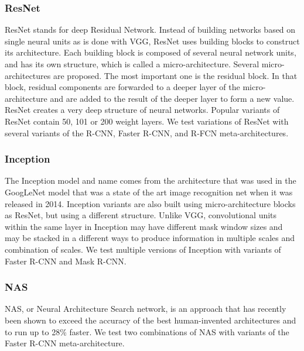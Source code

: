 \documentclass[conference]{IEEEtran}
\begin{document}
\subsubsection{ResNet}
ResNet stands for deep Residual Network.  Instead of building networks based on single neural units as is done with VGG, ResNet uses building blocks to construct its architecture. 
Each building block is composed of several neural network units, and has its own structure, which is called a micro-architecture. 
Several micro-architectures are proposed.  The most important one is the residual block. 
In that block, residual components are forwarded to a deeper layer of the micro-architecture and are added to the result of the deeper layer to form a new value. 
ResNet creates a very deep structure of neural networks. 
Popular variants of ResNet contain 50, 101 or 200 weight layers.
We test variations of ResNet with several variants of the R-CNN, Faster R-CNN, and R-FCN meta-architectures.

\subsubsection{Inception}
The Inception model and name comes from the architecture that was used in the GoogLeNet model that was a state of the art image recognition net when it was released in 2014.
Inception variants are also built using micro-architecture blocks as ResNet, but using a different structure. 
Unlike VGG, convolutional units within the same layer in Inception may have different mask window sizes and may be stacked in a different ways to produce information in multiple scales and combination of scales.  
We test multiple versions of Inception with variants of Faster R-CNN and Mask R-CNN.


\subsubsection{NAS}
NAS, or Neural Architecture Search network, is an approach that  has recently been shown to exceed the accuracy of the best human-invented architectures and to run up to 28\% faster.
We test two combinations of NAS with variants of the Faster R-CNN meta-architecture.


\end{document}
